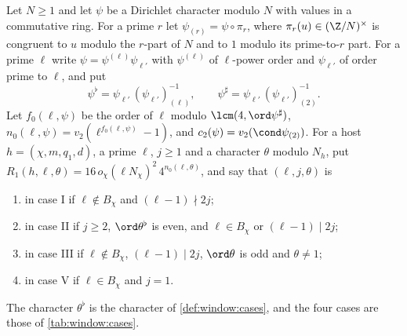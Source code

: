 \begin{definition}\label{pf:vwin-he:cases}
Let $N\ge1$ and let $\psi$ be a Dirichlet character modulo $N$ with values in a commutative ring. For a prime $r$
let $\psi_{(r)}=\psi\circ\pi_r$, where $\pi_r(u)\in(\Z/N)^\times$ is congruent to $u$ modulo the $r$-part of $N$
and to $1$ modulo its prime-to-$r$ part. For a prime $\ell$ write $\psi=\psi^{(\ell)}\psi_{\ell'}$ with
$\psi^{(\ell)}$ of $\ell$-power order and $\psi_{\ell'}$ of order prime to $\ell$, and put
\[
 \psi^\flat=\psi_{\ell'}\,(\psi_{\ell'})_{(\ell)}^{-1},\qquad \psi^\sharp=\psi_{\ell'}\,(\psi_{\ell'})_{(2)}^{-1}.
\]
Let $f_0(\ell,\psi)$ be the order of $\ell$ modulo $\lcm(4,\ord\psi^\sharp)$, $n_0(\ell,\psi)=v_2(\ell^{f_0(\ell,\psi)}-1)$,
and $c_2(\psi)=v_2(\cond\psi_{(2)})$. For a host $h=(\chi,m,q_1,d)$, a prime $\ell$, $j\ge1$ and a character
$\theta$ modulo $N_h$, put $R_1(h,\ell,\theta)=16\,o_\chi(\ell N_\chi)^2\,4^{n_0(\ell,\theta)}$, and say that
$(\ell,j,\theta)$ is
\begin{enumerate}[label=(\Roman*)]
\item[(I)] in case I if $\ell\notin B_\chi$ and $(\ell-1)\nmid2j$;
\item[(II)] in case II if $j\ge2$, $\ord\theta^\flat$ is even, and $\ell\in B_\chi$ or $(\ell-1)\mid2j$;
\item[(III)] in case III if $\ell\notin B_\chi$, $(\ell-1)\mid 2j$, $\ord\theta$ is odd and $\theta\ne1$;
\item[(V)] in case V if $\ell\in B_\chi$ and $j=1$.
\end{enumerate}
\end{definition}

The character $\theta^\flat$ is the character of \cref{def:window:cases}, and the four cases are those of
\cref{tab:window:cases}.

